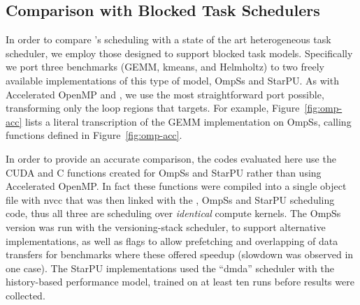 
\subsection{Comparison with Blocked Task Schedulers}
\label{sec:ompss}

In order to compare \tsar's scheduling with a state of the art heterogeneous
task scheduler, we employ those designed to support blocked task models.
Specifically we port three benchmarks (GEMM, kmeans, and Helmholtz) to two
freely available implementations of this type of model, OmpSs and StarPU. As
with Accelerated OpenMP and \tsar, we use the most straightforward port
possible, transforming only the loop regions that \tsar targets.  For
example, Figure~\ref{fig:omp-acc} lists a literal transcription of the GEMM
implementation on OmpSs, calling functions defined in Figure~\ref{fig:omp-acc}.

In order to provide an accurate comparison, the \tsar codes evaluated here use
the CUDA and C functions created for OmpSs and StarPU rather than using
Accelerated OpenMP. In fact these functions were compiled into a single object
file with nvcc that was then linked with the \tsar, OmpSs and StarPU
scheduling code, thus all three are scheduling over \emph{identical} compute
kernels.  The OmpSs version was run with the versioning-stack scheduler, to
support alternative implementations, as well as flags to allow prefetching and
overlapping of data transfers for benchmarks where these offered speedup
(slowdown was observed in one case).  The StarPU implementations used the
``dmda'' scheduler with the history-based performance model, trained on at
least ten runs before results were collected.  



